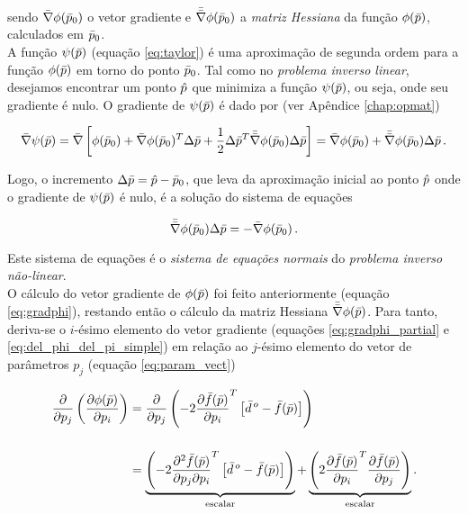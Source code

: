 \noindent sendo $\bar{\nabla}\phi(\bar{p}_0)$ o vetor gradiente  e
$\bar{\bar{\nabla}}\phi(\bar{p}_0)$ a {\it matriz Hessiana} da função $\phi(\bar{p})$,
calculados em $\bar{p}_0$.
\\
\indent A função $\psi(\bar{p})$ (equação \ref{eq:taylor}) é uma aproximação
de segunda ordem para a função $\phi(\bar{p})$ em torno do ponto $\bar{p}_0$.
Tal como no {\it problema inverso linear}, desejamos encontrar um ponto $\hat{p}$
que minimiza a função $\psi(\bar{p})$, ou seja, onde seu gradiente é nulo.
O gradiente de $\psi(\bar{p})$ é dado por (ver Apêndice \ref{chap:opmat})

\begin{equation}
\bar{\nabla}\psi(\bar{p}) = \bar{\nabla}\left[
    \phi(\bar{p}_0) +
    \bar{\nabla}\phi(\bar{p}_0)^T\Delta\bar{p} +
    \frac{1}{2}\Delta\bar{p}^T\bar{\bar{\nabla}}\phi(\bar{p}_0)\Delta\bar{p}
    \right] =
    \bar{\nabla}\phi(\bar{p}_0) + \bar{\bar{\nabla}}\phi(\bar{p}_0)\Delta\bar{p}
    \thinspace .
\end{equation}

\noindent Logo, o incremento $\Delta\bar{p} = \hat{p} - \bar{p}_0$, que leva
da aproximação inicial ao ponto $\hat{p}$ onde o gradiente de $\psi(\bar{p})$ é
nulo, é a solução do sistema de equações

\begin{equation}
     \bar{\bar{\nabla}}\phi(\bar{p}_0)\Delta\bar{p} = -\bar{\nabla}\phi(\bar{p}_0)
    \thinspace .
\label{eq:sistema_normal_nlin}
\end{equation}

\noindent Este sistema de equações é o {\it sistema de equações normais} do
{\it problema inverso não-linear}.
\\
\indent O cálculo do vetor gradiente de $\phi(\bar{p})$ foi feito anteriormente
(equação \ref{eq:gradphi}), restando então o cálculo da matriz Hessiana
$\bar{\bar{\nabla}}\phi(\bar{p})$.
Para tanto, deriva-se o $i$-ésimo elemento do vetor gradiente
(equações \ref{eq:gradphi_partial} e \ref{eq:del_phi_del_pi_simple}) em relação
ao $j$-ésimo elemento do vetor de parâmetros $p_j$ (equação \ref{eq:param_vect})

\begin{equation}
\begin{split}
\dfrac{\partial}{\partial p_j}\left(\dfrac{\partial \phi(\bar{p})}{\partial p_i}\right)
&=
\dfrac{\partial}{\partial p_j}\left(
    -2\dfrac{\partial\bar{f}(\bar{p})}{\partial p_i}^T
    \left[\bar{d}^{\thinspace o} - \bar{f}(\bar{p})\right]
    \right)
\\[0.5cm]
&=
\underbrace{
\left( -2\dfrac{\partial^2 \bar{f}(\bar{p})}{\partial p_j \partial p_i}^T
\left[\bar{d}^{\thinspace o} - \bar{f}(\bar{p})\right]
\right)}_{\text{escalar}} +
\underbrace{
\left( 2 \dfrac{\partial\bar{f}(\bar{p})}{\partial p_i}^T
    \dfrac{\partial\bar{f}(\bar{p})}{\partial p_j} \right)}_{\text{escalar}} .
\end{split}
\label{eq:hessian_ij_exact}
\end{equation}

